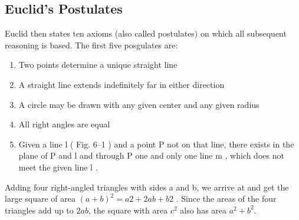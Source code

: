 \subsection{Euclid's Postulates}
Euclid then states ten axioms (also called postulates) on which all subsequent reasoning is based. The first five posgulates are:
\begin{enumerate}
    \item Two points determine a unique straight line
    \item A straight line extends indefinitely far in either direction
    \item A circle may be drawn with any given center and any given radius
    \item All right angles are equal
    \item Given a line l ( Fig. 6–1 ) and a point P not on that line, there exists in the plane of P and l and through P one and only one line m , which does not meet the given line l .
\end{enumerate}





Adding four right-angled triangles with sides a and b, we arrive at and get the large square of area $(a + b)^2 = a 2 + 2ab + b 2$ . Since the areas of the four triangles add up to $2ab$, the square with area $c^2$ also has area $a^2 + b^2$. 

